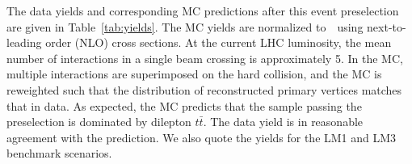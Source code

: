 
The data yields and corresponding MC predictions after this event preselection
are given in Table~\ref{tab:yields}. The MC yields are normalized to~\lumifinal\ using 
next-to-leading order (NLO) cross sections. At the current LHC luminosity, the mean
number of interactions in a single beam crossing is approximately 5. In the MC, multiple interactions
are superimposed on the hard collision, and the MC is reweighted such that the distribution
of reconstructed primary vertices matches that in data. As expected, the MC predicts that the 
sample passing the preselection is dominated by dilepton $t\bar{t}$. The data yield is in 
reasonable agreement with the prediction. We also quote the yields for
the LM1 and LM3 benchmark scenarios.

